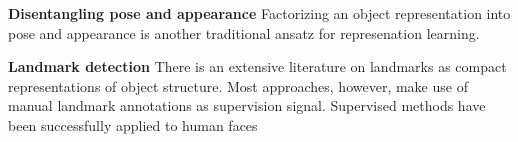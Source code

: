 \textbf{Disentangling pose and appearance} Factorizing an object representation into pose and appearance is another traditional ansatz for represenation learning. %

\textbf{Landmark detection} There is an extensive literature on landmarks as compact representations of object structure. Most approaches, however, make use of manual landmark annotations as supervision signal. Supervised methods have been successfully applied to human faces %